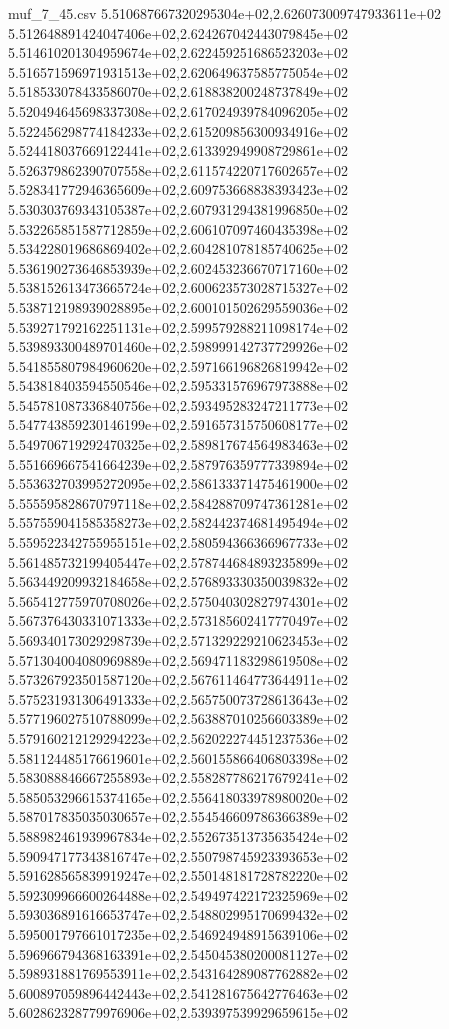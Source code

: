 \begin{filecontents*}{muf_7_45.csv}
5.510687667320295304e+02,2.626073009747933611e+02
5.512648891424047406e+02,2.624267042443079845e+02
5.514610201304959674e+02,2.622459251686523203e+02
5.516571596971931513e+02,2.620649637585775054e+02
5.518533078433586070e+02,2.618838200248737849e+02
5.520494645698337308e+02,2.617024939784096205e+02
5.522456298774184233e+02,2.615209856300934916e+02
5.524418037669122441e+02,2.613392949908729861e+02
5.526379862390707558e+02,2.611574220717602657e+02
5.528341772946365609e+02,2.609753668838393423e+02
5.530303769343105387e+02,2.607931294381996850e+02
5.532265851587712859e+02,2.606107097460435398e+02
5.534228019686869402e+02,2.604281078185740625e+02
5.536190273646853939e+02,2.602453236670717160e+02
5.538152613473665724e+02,2.600623573028715327e+02
5.538712198939028895e+02,2.600101502629559036e+02
5.539271792162251131e+02,2.599579288211098174e+02
5.539893300489701460e+02,2.598999142737729926e+02
5.541855807984960620e+02,2.597166196826819942e+02
5.543818403594550546e+02,2.595331576967973888e+02
5.545781087336840756e+02,2.593495283247211773e+02
5.547743859230146199e+02,2.591657315750608177e+02
5.549706719292470325e+02,2.589817674564983463e+02
5.551669667541664239e+02,2.587976359777339894e+02
5.553632703995272095e+02,2.586133371475461900e+02
5.555595828670797118e+02,2.584288709747361281e+02
5.557559041585358273e+02,2.582442374681495494e+02
5.559522342755955151e+02,2.580594366366967733e+02
5.561485732199405447e+02,2.578744684893235899e+02
5.563449209932184658e+02,2.576893330350039832e+02
5.565412775970708026e+02,2.575040302827974301e+02
5.567376430331071333e+02,2.573185602417770497e+02
5.569340173029298739e+02,2.571329229210623453e+02
5.571304004080969889e+02,2.569471183298619508e+02
5.573267923501587120e+02,2.567611464773644911e+02
5.575231931306491333e+02,2.565750073728613643e+02
5.577196027510788099e+02,2.563887010256603389e+02
5.579160212129294223e+02,2.562022274451237536e+02
5.581124485176619601e+02,2.560155866406803398e+02
5.583088846667255893e+02,2.558287786217679241e+02
5.585053296615374165e+02,2.556418033978980020e+02
5.587017835035030657e+02,2.554546609786366389e+02
5.588982461939967834e+02,2.552673513735635424e+02
5.590947177343816747e+02,2.550798745923393653e+02
5.591628565839919247e+02,2.550148181728782220e+02
5.592309966600264488e+02,2.549497422172325969e+02
5.593036891616653747e+02,2.548802995170699432e+02
5.595001797661017235e+02,2.546924948915639106e+02
5.596966794368163391e+02,2.545045380200081127e+02
5.598931881769553911e+02,2.543164289087762882e+02
5.600897059896442443e+02,2.541281675642776463e+02
5.602862328779976906e+02,2.539397539929659615e+02

\end{filecontents*}
